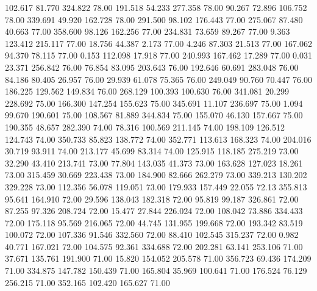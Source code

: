  102.617   81.770  324.822        78.00
 191.518   54.233  277.358        78.00
  90.267   72.896  106.752        78.00
 339.691   49.920  162.728        78.00
 291.500   98.102  176.443        77.00
 275.067   87.480   40.663        77.00
 358.600   98.126  162.256        77.00
 234.831   73.659   89.267        77.00
   9.363  123.412  215.117        77.00
  18.756   44.387    2.173        77.00
   4.246   87.303   21.513        77.00
 167.062   94.370   78.115        77.00
   0.153  112.098   17.918        77.00
 240.993  167.462   17.289        77.00
   0.031   23.371  256.842        76.00
  76.854   83.095  203.643        76.00
 192.646   60.691  283.048        76.00
  84.186   80.405   26.957        76.00
  29.939   61.078   75.365        76.00
 249.049   90.760   70.447        76.00
 186.225  129.562  149.834        76.00
 268.129  100.393  100.630        76.00
 341.081   20.299  228.692        75.00
 166.300  147.254  155.623        75.00
 345.691   11.107  236.697        75.00
   1.094   99.670  190.601        75.00
 108.567   81.889  344.834        75.00
 155.070   46.130  157.667        75.00
 190.355   48.657  282.390        74.00
  78.316  100.569  211.145        74.00
 198.109  126.512  124.743        74.00
 350.733   85.823  138.772        74.00
 352.771  113.613  168.323        74.00
 204.016   30.719   93.911        74.00
 213.177   45.699   83.314        74.00
 125.915  118.185  275.219        73.00
  32.290   43.410  213.741        73.00
  77.804  143.035   41.373        73.00
 163.628  127.023   18.261        73.00
 315.459   30.669  223.438        73.00
 184.900   82.666  262.279        73.00
 339.213  130.202  329.228        73.00
 112.356   56.078  119.051        73.00
 179.933  157.449   22.055        72.13
 355.813   95.641  164.910        72.00
  29.596  138.043  182.318        72.00
  95.819   99.187  326.861        72.00
  87.255   97.326  208.724        72.00
  15.477   27.844  226.024        72.00
 108.042   73.886  334.433        72.00
 175.118   95.569  216.065        72.00
  44.745  131.955  199.668        72.00
 193.342   83.519  100.072        72.00
 107.336   91.546  332.560        72.00
  88.410  102.545  315.237        72.00
   0.982   40.771  167.021        72.00
 104.575   92.361  334.688        72.00
 202.281   63.141  253.106        71.00
  37.671  135.761  191.900        71.00
  15.820  154.052  205.578        71.00
 356.723   69.436  174.209        71.00
 334.875  147.782  150.439        71.00
 165.804   35.969  100.641        71.00
 176.524   76.129  256.215        71.00
 352.165  102.420  165.627        71.00
